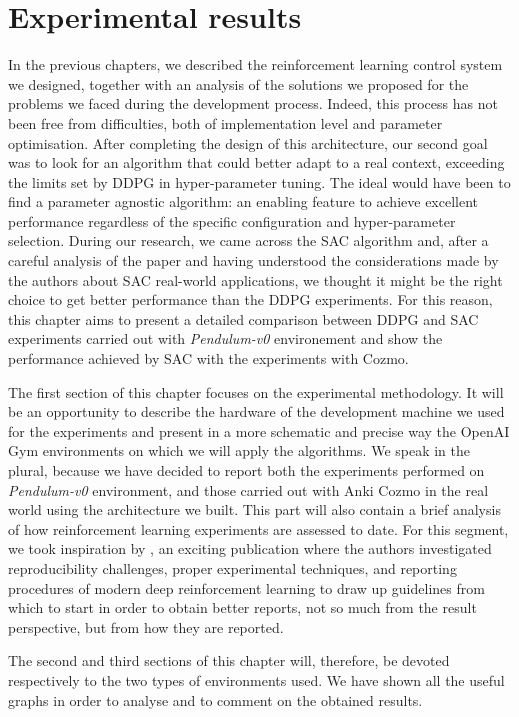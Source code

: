 \chapter{Experimental results} \label{ch:ch5}

In the previous chapters, we described the reinforcement learning control system we designed, together with an analysis of the solutions we proposed for the problems we faced during the development process.
Indeed, this process has not been free from difficulties, both of implementation level and parameter optimisation.
After completing the design of this architecture, our second goal was to look for an algorithm that could better adapt to a real context, exceeding the limits set by DDPG in hyper-parameter tuning.
The ideal would have been to find a parameter agnostic algorithm: an enabling feature to achieve excellent performance regardless of the specific configuration and hyper-parameter selection.
During our research, we came across the SAC algorithm and, after a careful analysis of the paper and having understood the considerations made by the authors about SAC real-world applications, we thought it might be the right choice to get better performance than the DDPG experiments.
For this reason, this chapter aims to present a detailed comparison between DDPG and SAC experiments carried out with \textit{Pendulum-v0} environement and show the performance achieved by SAC with the experiments with Cozmo.

The first section of this chapter focuses on the experimental methodology.
It will be an opportunity to describe the hardware of the development machine we used for the experiments and present in a more schematic and precise way the OpenAI Gym environments on which we will apply the algorithms.
We speak in the plural, because we have decided to report both the experiments performed on \textit{Pendulum-v0} environment, and those carried out with Anki Cozmo in the real world using the architecture we built.
This part will also contain a brief analysis of how reinforcement learning experiments are assessed to date.
For this segment, we took inspiration by \cite{henderson2018deep}, an exciting publication where the authors investigated reproducibility challenges, proper experimental techniques, and reporting procedures of modern deep reinforcement learning to draw up guidelines from which to start in order to obtain better reports, not so much from the result perspective, but from how they are reported.

The second and third sections of this chapter will, therefore, be devoted respectively to the two types of environments used.
We have shown all the useful graphs in order to analyse and to comment on the obtained results.


